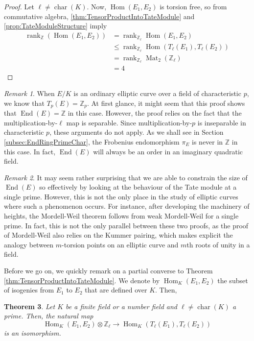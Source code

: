 \documentclass{amsart}
\newtheorem{thm}{Theorem}[section]
\theoremstyle{definition}
\theoremstyle{remark}
\newtheorem{remark}[thm]{Remark}
\numberwithin{equation}{section}
\newcommand{\bbZ}{\mathbb Z}
\DeclareMathOperator{\Char}{char}
\DeclareMathOperator{\End}{End}
\DeclareMathOperator{\Hom}{Hom}
\DeclareMathOperator{\Mat}{Mat}
\DeclareMathOperator{\rank}{rank}
\begin{document}
\begin{proof}
Let $\ell \neq \Char(K)$. Now, $\Hom(E_{1}, E_{2})$ is torsion free, so from commutative algebra, \ref{thm:TensorProductIntoTateModule} and \ref{prop:TateModuleStructure} imply
\begin{align*}
        \rank_{\bbZ}(\Hom(E_1,E_2)) 
    & =   \rank_{\bbZ_{\ell}} \Hom(E_{1}, E_{2})\\
  &\leq  \rank_{\bbZ_{\ell}} \Hom(T_{\ell}(E_{1}), T_{\ell}(E_{2}))\\
    &=   \rank_{\bbZ_{\ell}} \Mat_{2}(\bbZ_{\ell})\\
    &=   4
\end{align*}
\end{proof}

\begin{remark} \label{rem:WhyNotLEqualsP}
When $E/K$ is an ordinary elliptic curve over a field of characteristic $p$, we know that $T_{p}(E) = \bbZ_{p}$. At first glance, it might seem that this proof shows that $\End(E) = \bbZ$ in this case. However, the proof relies on the fact that the multiplication-by-$\ell$ map is separable. Since multiplication-by-$p$ is inseparable in characteristic $p$, these arguments do not apply. As we shall see in Section \ref{subsec:EndRingPrimeChar},
the Frobenius endomorphism $\pi_{E}$ is never in $\bbZ$ in this case. 
In fact, $\End(E)$ will always be an order in an imaginary quadratic field.
\end{remark}

\begin{remark}
It may seem rather surprising that we are able to constrain the size of $\End(E)$ so effectively by looking at the behaviour of the Tate module at a single prime. 
However, this is not the only place in the study of elliptic curves where such a phenomenon occurs. For instance, after developing the machinery of heights, %
the Mordell-Weil theorem follows from weak Mordell-Weil for a single prime. In fact, this is not the only parallel between these two proofs, as the proof of Mordell-Weil also relies on the Kummer pairing, which makes explicit the analogy between $m$-torsion points on an elliptic curve and $m$th roots of unity in a field.
\end{remark}

Before we go on, we quickly remark on a partial converse to Theorem \ref{thm:TensorProductIntoTateModule}. We denote by $\Hom_{K}(E_{1}, E_{2})$ the subset of isogenies from $E_{1}$ to $E_{2}$ that are defined over $K$. Then, 
\begin{thm}
Let $K$ be a finite field or a number field and $\ell \neq \Char(K)$ a prime. Then, the natural map
\[
\Hom_{K}(E_{1}, E_{2}) \otimes \bbZ_{\ell} \to \Hom_{K}(T_{\ell}(E_{1}), T_{\ell}(E_{2}))
\]
is an isomorphism.
\end{thm}
\end{document}
